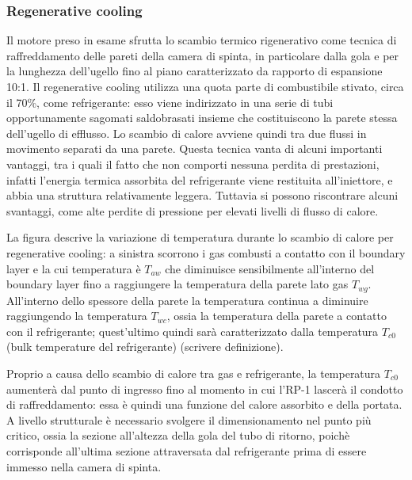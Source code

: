 \subsubsection{Regenerative cooling}
\label{subsubsec:regenerative cooling}

Il motore preso in esame sfrutta lo scambio termico rigenerativo come tecnica di raffreddamento delle pareti della camera di spinta, in particolare dalla gola e per la lunghezza dell'ugello fino al piano caratterizzato da rapporto di espansione 10:1. Il regenerative cooling utilizza una quota parte di combustibile stivato, circa il 70\%, come refrigerante: esso viene indirizzato in una serie di tubi opportunamente sagomati saldobrasati insieme che costituiscono la parete stessa dell'ugello di efflusso. Lo scambio di calore avviene quindi tra due flussi in movimento separati da una parete.
Questa tecnica vanta di alcuni importanti vantaggi, tra i quali il fatto che non comporti nessuna perdita di prestazioni, infatti l'energia termica assorbita del refrigerante viene restituita all'iniettore, e abbia una struttura relativamente leggera. Tuttavia si possono riscontrare alcuni svantaggi, come alte perdite di pressione per elevati livelli di flusso di calore.


La figura descrive la variazione di temperatura durante lo scambio di calore per regenerative cooling: a sinistra scorrono i gas combusti a contatto con il boundary layer e la cui temperatura è $T_{aw}$ che diminuisce sensibilmente all'interno del boundary layer fino a raggiungere la temperatura della parete lato gas $T_{wg}$. All'interno dello spessore della parete la temperatura continua a diminuire raggiungendo la temperatura $T_{wc}$, ossia la temperatura della parete a contatto con il refrigerante; quest'ultimo quindi sarà caratterizzato dalla temperatura $T_{c0}$ (bulk temperature del refrigerante) (scrivere definizione).

Proprio a causa dello scambio di calore tra gas e refrigerante, la temperatura $T_{c0}$ aumenterà dal punto di ingresso fino al momento in cui l'RP-1 lascerà il condotto di raffreddamento: essa è quindi una funzione del calore assorbito e della portata. A livello strutturale è necessario svolgere il dimensionamento nel punto più critico, ossia la sezione all'altezza della gola del tubo di ritorno, poichè corrisponde all'ultima sezione attraversata dal refrigerante prima di essere immesso nella camera di spinta.

